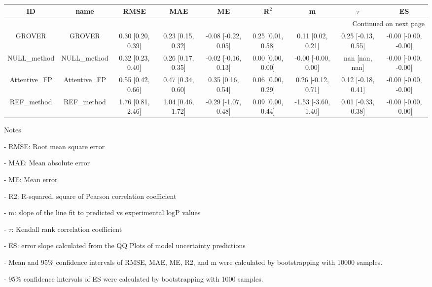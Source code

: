 \documentclass{article}
\begin{document}
\begin{center}
\scriptsize
\begin{longtable}{|ccccccccc|}
\toprule
           ID &          name &               RMSE &                MAE &                   ME &              R$^2$ &                    m &              $\tau$ &                    ES \\
\midrule
\endhead
\midrule
\multicolumn{9}{r}{{Continued on next page}} \\
\midrule
\endfoot

\bottomrule
\endlastfoot
       GROVER &        GROVER &  0.30 [0.20, 0.39] &  0.23 [0.15, 0.32] &  -0.08 [-0.22, 0.05] &  0.25 [0.01, 0.58] &    0.11 [0.02, 0.21] &  0.25 [-0.13, 0.55] &  -0.00 [-0.00, -0.00] \\
  NULL_method &   NULL_method &  0.32 [0.23, 0.40] &  0.26 [0.17, 0.35] &  -0.02 [-0.16, 0.13] &  0.00 [0.00, 0.00] &  -0.00 [-0.00, 0.00] &      nan [nan, nan] &  -0.00 [-0.00, -0.00] \\
 Attentive_FP &  Attentive_FP &  0.55 [0.42, 0.66] &  0.47 [0.34, 0.60] &    0.35 [0.16, 0.54] &  0.06 [0.00, 0.29] &   0.26 [-0.12, 0.71] &  0.12 [-0.18, 0.41] &  -0.00 [-0.00, -0.00] \\
   REF_method &    REF_method &  1.76 [0.81, 2.46] &  1.04 [0.46, 1.72] &  -0.29 [-1.07, 0.48] &  0.09 [0.00, 0.44] &  -1.53 [-3.60, 1.40] &  0.01 [-0.33, 0.38] &  -0.00 [-0.00, -0.00] \\
\end{longtable}
\end{center}

Notes

- RMSE: Root mean square error

- MAE: Mean absolute error

- ME: Mean error

- R2: R-squared, square of Pearson correlation coefficient

- m: slope of the line fit to predicted vs experimental logP values

- $\tau$:  Kendall rank correlation coefficient

- ES: error slope calculated from the QQ Plots of model uncertainty predictions

- Mean and 95\% confidence intervals of RMSE, MAE, ME, R2, and m were calculated by bootstrapping with 10000 samples.

- 95\% confidence intervals of ES were calculated by bootstrapping with 1000 samples.\end{document}
\end{document}
